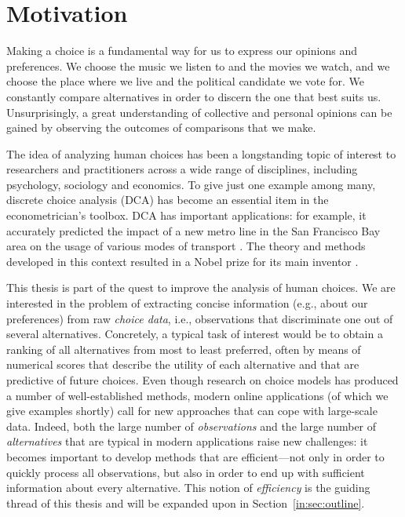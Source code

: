 \section{Motivation}
\label{in:sec:motivation}

Making a choice is a fundamental way for us to express our opinions and preferences.
We choose the music we listen to and the movies we watch, and we choose the place where we live and the political candidate we vote for.
We constantly compare alternatives in order to discern the one that best suits us.
Unsurprisingly, a great understanding of collective and personal opinions can be gained by observing the outcomes of comparisons that we make.

The idea of analyzing human choices has been a longstanding topic of interest to researchers and practitioners across a wide range of disciplines, including psychology, sociology and economics.
To give just one example among many, discrete choice analysis (DCA) has become an essential item in the econometrician's toolbox.
DCA has important applications: for example, it accurately predicted the impact of a new metro line in the San Francisco Bay area on the usage of various modes of transport \citep{mcfadden1977demand}.
The theory and methods developed in this context resulted in a Nobel prize for its main inventor \citep{mcfadden2001economic}.

This thesis is part of the quest to improve the analysis of human choices.
We are interested in the problem of extracting concise information (e.g., about our preferences) from raw \emph{choice data}, i.e., observations that discriminate one out of several alternatives.
Concretely, a typical task of interest would be to obtain a ranking of all alternatives from most to least preferred, often by means of numerical scores that describe the utility of each alternative and that are predictive of future choices.
Even though research on choice models has produced a number of well-established methods, modern online applications (of which we give examples shortly) call for new approaches that can cope with large-scale data.
Indeed, both the large number of \emph{observations} and the large number of \emph{alternatives} that are typical in modern applications raise new challenges:
it becomes important to develop methods that are efficient---not only in order to quickly process all observations, but also in order to end up with sufficient information about every alternative.
This notion of \emph{efficiency} is the guiding thread of this thesis and will be expanded upon in Section~\ref{in:sec:outline}.

